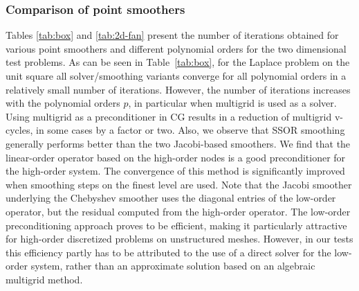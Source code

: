\documentclass[smallcondensed,final]{svjour3}     %
\newcommand{\gsnote}[1]{\textcolor{blue}{GS: #1}}
\begin{document}
\subsubsection{Comparison of point smoothers}\label{subsec:num_point}
Tables \ref{tab:box} and \ref{tab:2d-fan} present the number of
iterations obtained for various point smoothers and different
polynomial orders for the two dimensional test problems. As can be seen in
Table~\ref{tab:box}, for the Laplace problem on the unit square all
solver/smoothing variants converge for all polynomial orders in a
relatively small number of iterations. However, the number of
iterations increases with the polynomial orders $p$, in particular
when multigrid is used as a solver. Using multigrid as a
preconditioner in CG results in a reduction of multigrid v-cycles, in
some cases by a factor or two. Also, we observe that SSOR
smoothing generally performs better than the two Jacobi-based
smoothers. We find that the linear-order operator based on the
high-order nodes is a good preconditioner for the high-order
system. The convergence of this method is significantly improved when
smoothing steps on the finest level are used. Note that the Jacobi
smoother underlying the Chebyshev smoother uses the diagonal entries
of the low-order operator, but the residual computed from the
high-order operator. The low-order preconditioning approach proves to
be efficient, making it particularly attractive for high-order
discretized problems on unstructured meshes. However, in our tests
this efficiency partly has to be attributed to the use of a direct
solver for the low-order system, rather than an approximate solution
based on an algebraic multigrid method.

\end{document}
